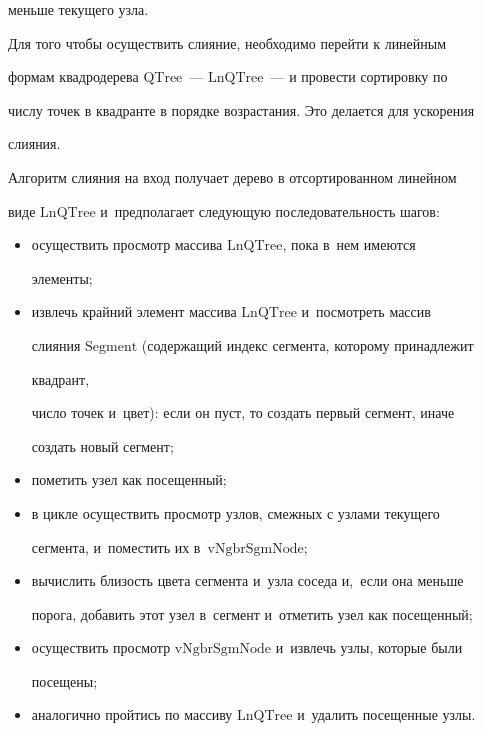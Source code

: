 меньше текущего узла.

  

  Для того чтобы осуществить слияние, необходимо перейти к линейным 

формам квадродерева $\mathrm{QTree}$~--- $\mathrm{LnQTree}$~--- и провести сортировку по 

числу точек в квадранте в порядке возрастания. Это делается для ускорения 

слияния. 

  

  Алгоритм слияния на вход получает дерево в отсортированном линейном 

виде $\mathrm{LnQTree}$ и~предполагает следующую последовательность шагов:

  \begin{itemize}

\item осуществить просмотр массива $\mathrm{LnQTree}$, пока в~нем имеются 

элементы;

\item извлечь крайний элемент массива $\mathrm{LnQTree}$ и~посмотреть массив 

слияния $\mathrm{Segment}$ (содержащий индекс сегмента, которому принадлежит 

квадрант,

число точек и~цвет): если он пуст, то создать первый сегмент, иначе 

создать новый сегмент;



\item пометить узел как посещенный;

\item в цикле осуществить просмотр узлов, смежных с узлами текущего 

сегмента, и~поместить их в~$\mathrm{vNgbrSgmNode}$;

\item вычислить близость цвета сегмента и~узла соседа и,~если она меньше 

порога, добавить этот узел в~сегмент и~отметить узел как посещенный;

\item осуществить просмотр $\mathrm{vNgbrSgmNode}$ и~извлечь узлы, которые были 

посещены;

\item аналогично пройтись по массиву $\mathrm{LnQTree}$ и~удалить посещенные узлы.

  \end{itemize}

